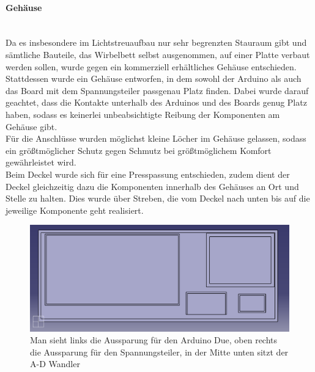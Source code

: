 \paragraph{Gehäuse} 
\hfill \\
Da es insbesondere im Lichtstreuaufbau nur sehr begrenzten Stauraum gibt und sämtliche Bauteile, das Wirbelbett selbst ausgenommen, auf einer Platte verbaut werden sollen, wurde gegen ein kommerziell erhältliches Gehäuse entschieden. \\ 
Stattdessen wurde ein Gehäuse entworfen, in dem sowohl der Arduino als auch das Board mit dem Spannungsteiler passgenau Platz finden. Dabei wurde darauf geachtet, dass die Kontakte unterhalb des Arduinos und des Boards genug Platz haben, sodass es keinerlei unbeabsichtigte Reibung der Komponenten am Gehäuse gibt. \\
Für die Anschlüsse wurden möglichst kleine Löcher im Gehäuse gelassen, sodass ein größtmöglicher Schutz gegen Schmutz bei größtmöglichem Komfort gewährleistet wird. \\
Beim Deckel wurde sich für eine Presspassung entschieden, zudem dient der Deckel gleichzeitig dazu die Komponenten innerhalb des Gehäuses an Ort und Stelle zu halten. Dies wurde über Streben, die vom Deckel nach unten bis auf die jeweilige Komponente geht realisiert.

\begin{figure}[h!]
	\begin{center}
		\includegraphics[scale=0.4]{Elektronik_Gehaeuse1.png}
		\caption[Gehäuse Draufsicht]{Man sieht links die Aussparung für den Arduino Due, oben rechts die Aussparung für den Spannungsteiler, in der Mitte unten sitzt der A-D Wandler}
	\end{center}
\end{figure}

